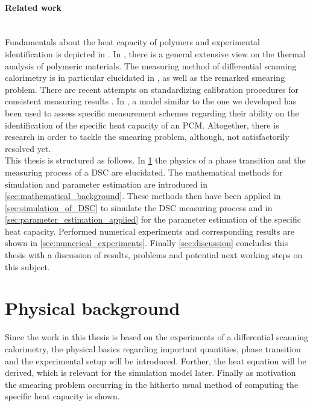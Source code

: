 \documentclass{scrartcl}[12pt, halfparskip]
\numberwithin{equation}{section}
\numberwithin{figure}{section}
\numberwithin{table}{section}
\begin{document}
\paragraph{Related work} \mbox{}\\
Fundamentals about the heat capacity of polymers and experimental identification is depicted in \cite{wunderlich_heat_capacity_polymers}.
In \cite{wunderlich_thermal_analysis}, there is a general extensive view on the thermal analysis of polymeric materials.
The measuring method of differential scanning calorimetry is in particular elucidated in \cite{Hoehne_DSC}, as well as the remarked smearing problem. 
There are recent attempts on standardizing calibration procedures for consistent measuring results \cite{standardization_of_PCM}. 
In \cite{diss_DSC}, a model similar to the one we developed has been used to assess specific measurement schemes regarding their ability on the identification of the specific heat capacity of an PCM. 
Altogether, there is research in order to tackle the smearing problem, although, not satisfactorily resolved yet. \\

This thesis is structured as follows. In \cref{sec:physical_background} the physics of a phase transition and the measuring process of a DSC are elucidated. 
The mathematical methods for simulation and parameter estimation are introduced in \cref{sec:mathematical_background}. These methods then have been applied in \cref{sec:simulation_of_DSC} to simulate the DSC measuring process and in \cref{sec:parameter_estimation_applied} for the parameter estimation of the specific heat capacity. Performed numerical experiments and corresponding results are shown in \cref{sec:numerical_experiments}. Finally \cref{sec:discussion} concludes this thesis with a discussion of results, problems and potential next working steps on this subject.


\section{Physical background}
\label{sec:physical_background}

Since the work in this thesis is based on the experiments of a differential scanning calorimetry, the physical basics regarding important quantities, phase transition and the experimental setup will be introduced. Further, the heat equation will be derived, which is relevant for the simulation model later. Finally as motivation the smearing problem occurring in the hitherto usual method of computing the specific heat capacity is shown.
\end{document}
